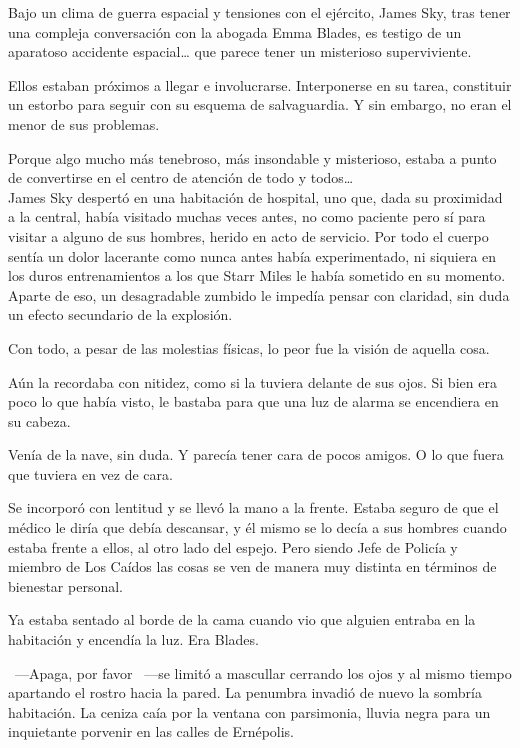 \begin{prev}
    Bajo un clima de guerra espacial y tensiones con el ejército, James Sky, tras tener una compleja conversación con la abogada Emma Blades, es testigo de un aparatoso accidente espacial\dots{} que parece tener un misterioso superviviente.
\end{prev}

\noindent{}Ellos estaban próximos a llegar e involucrarse. Interponerse en su tarea, constituir un estorbo para seguir con su esquema de salvaguardia. Y sin embargo, no eran el menor de sus problemas.

Porque algo mucho más tenebroso, más insondable y misterioso, estaba a punto de convertirse en el centro de atención de todo y todos\dots\\

\noindent{}James Sky despertó en una habitación de hospital, uno que, dada su proximidad a la central, había visitado muchas veces antes, no como paciente pero sí para visitar a alguno de sus hombres, herido en acto de servicio. Por todo el cuerpo sentía un dolor lacerante como nunca antes había experimentado, ni siquiera en los duros entrenamientos a los que Starr Miles le había sometido en su momento. Aparte de eso, un desagradable zumbido le impedía pensar con claridad, sin duda un efecto secundario de la explosión.

Con todo, a pesar de las molestias físicas, lo peor fue la visión de aquella cosa.

Aún la recordaba con nitidez, como si la tuviera delante de sus ojos. Si bien era poco lo que había visto, le bastaba para que una luz de alarma se encendiera en su cabeza.

Venía de la nave, sin duda. Y parecía tener cara de pocos amigos. O lo que fuera que tuviera en vez de cara.

Se incorporó con lentitud y se llevó la mano a la frente. Estaba seguro de que el médico le diría que debía descansar, y él mismo se lo decía a sus hombres cuando estaba frente a ellos, al otro lado del espejo. Pero siendo Jefe de Policía y miembro de Los Caídos las cosas se ven de manera muy distinta en términos de bienestar personal.

Ya estaba sentado al borde de la cama cuando vio que alguien entraba en la habitación y encendía la luz. Era Blades.

~---Apaga, por favor ~---se limitó a mascullar cerrando los ojos y al mismo tiempo apartando el rostro hacia la pared. La penumbra invadió de nuevo la sombría habitación. La ceniza caía por la ventana con parsimonia, lluvia negra para un inquietante porvenir en las calles de Ernépolis.

